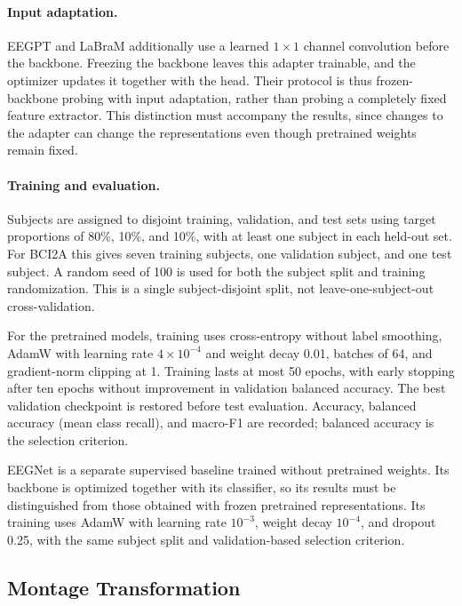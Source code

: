 \documentclass{article}
\begin{document}
\paragraph{Input adaptation.}
EEGPT and LaBraM additionally use a learned $1\times1$ channel convolution
before the backbone. Freezing the backbone leaves this adapter trainable,
and the optimizer updates it together with the head. Their protocol is thus frozen-backbone probing with input
adaptation, rather than probing a completely fixed feature extractor.
This distinction must accompany the results, since changes to the adapter
can change the representations even though pretrained weights remain fixed.

\paragraph{Training and evaluation.}
Subjects are assigned to disjoint training, validation, and test sets using
target proportions of 80\%, 10\%, and 10\%, with at least one subject in
each held-out set. For BCI2A this gives seven training subjects, one
validation subject, and one test subject. A random seed of 100 is used for
both the subject split and training randomization.
This is a single subject-disjoint split, not leave-one-subject-out
cross-validation.

For the pretrained models, training uses cross-entropy without label
smoothing, AdamW with learning rate $4\times10^{-4}$ and weight decay 0.01,
batches of 64, and gradient-norm clipping at 1. Training lasts at most
50 epochs, with early stopping after ten epochs without improvement in
validation balanced accuracy. The best validation checkpoint is restored
before test evaluation. Accuracy, balanced accuracy (mean class recall),
and macro-F1 are recorded; balanced accuracy is the selection criterion.

EEGNet is a separate supervised baseline trained without pretrained
weights. Its backbone is optimized together with its classifier, so its
results must be distinguished from those obtained with frozen pretrained
representations. Its training uses AdamW with learning rate $10^{-3}$,
weight decay $10^{-4}$, and dropout 0.25, with the same subject split and
validation-based selection criterion.

\subsection{Montage Transformation}
\label{sec:montage-method}
\end{document}
